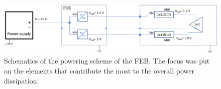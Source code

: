  \begin{figure}[h!]
\centering
\includegraphics[width=1\columnwidth]{Chapter6/DCS/images/powering_diss_feb.png}
\caption{Schematics of the powering scheme of the \gls{FEB}. The focus was put on the elements that contribute the most to the overall power dissipation.}
\label{fig_power_scheme}
\end{figure}
\begin{table}[!h]
\centering
\caption{Power dissipation of the powering system in the function of the CSA registers values. Once the ASICs are configured, the digital line current remains constant. }
\label{tab:distribution}
\end{table}

